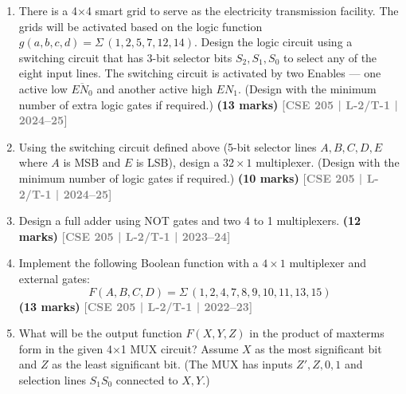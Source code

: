 \documentclass[12pt]{article}
\newcommand{\yr}[1]{\hfill\textcolor{gray}{\small\textbf{[#1]}}}
\newcommand{\mk}[1]{\textcolor{orange!70!black}{\small\textbf{(#1 marks)}}}
\begin{document}
\begin{enumerate}


\item There is a 4$\times$4 smart grid to serve as the electricity transmission facility. The grids will be activated based on the logic function $g(a,b,c,d) = \Sigma\,(1,2,5,7,12,14)$. Design the logic circuit using a switching circuit that has 3-bit selector bits $S_2, S_1, S_0$ to select any of the eight input lines. The switching circuit is activated by two Enables — one active low $\overline{EN_0}$ and another active high $EN_1$. (Design with the minimum number of extra logic gates if required.)
\mk{13} \yr{CSE 205 | L-2/T-1 | 2024--25}



\item Using the switching circuit defined above (5-bit selector lines $A, B, C, D, E$ where $A$ is MSB and $E$ is LSB), design a $32\times1$ multiplexer. (Design with the minimum number of logic gates if required.)
\mk{10} \yr{CSE 205 | L-2/T-1 | 2024--25}



\item Design a full adder using NOT gates and two 4 to 1 multiplexers.
\mk{12} \yr{CSE 205 | L-2/T-1 | 2023--24}



\item Implement the following Boolean function with a $4 \times 1$ multiplexer and external gates:
\[ F(A, B, C, D) = \Sigma\,(1, 2, 4, 7, 8, 9, 10, 11, 13, 15) \]
\mk{13} \yr{CSE 205 | L-2/T-1 | 2022--23}



\item What will be the output function $F(X, Y, Z)$ in the product of maxterms form in the given 4$\times$1 MUX circuit? Assume $X$ as the most significant bit and $Z$ as the least significant bit. (The MUX has inputs $Z', Z, 0, 1$ and selection lines $S_1S_0$ connected to $X, Y$.)

\begin{center}
\end{center}
\end{enumerate}
\end{document}
